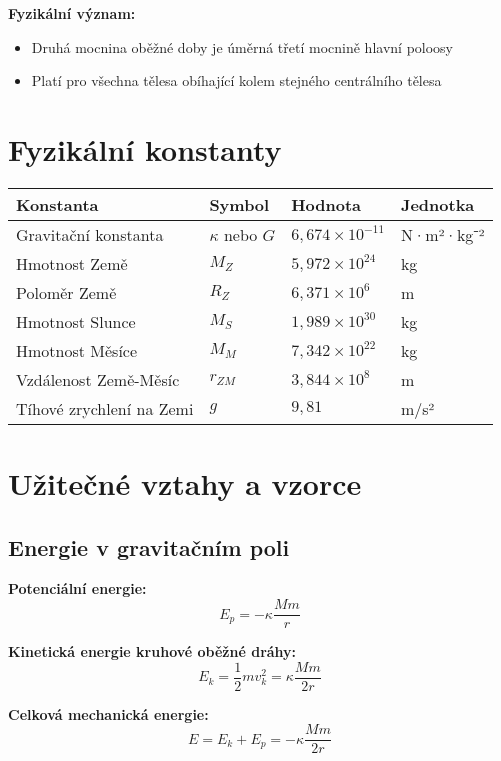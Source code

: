 \documentclass[11pt,a4paper]{article}
\begin{document}
\textbf{Fyzikální význam:}

\begin{itemize}
\item Druhá mocnina oběžné doby je úměrná třetí mocnině hlavní poloosy
\item Platí pro všechna tělesa obíhající kolem stejného centrálního tělesa
\end{itemize}

\clearpage

\section{Fyzikální konstanty}

\begin{longtable}{llll}
\toprule
Konstanta & Symbol & Hodnota & Jednotka \\
\midrule
Gravitační konstanta & $\kappa$ nebo $G$ & $6{,}674 \times 10^{-11}$ & N·m²·kg⁻² \\
Hmotnost Země & $M_Z$ & $5{,}972 \times 10^{24}$ & kg \\
Poloměr Země & $R_Z$ & $6{,}371 \times 10^{6}$ & m \\
Hmotnost Slunce & $M_S$ & $1{,}989 \times 10^{30}$ & kg \\
Hmotnost Měsíce & $M_M$ & $7{,}342 \times 10^{22}$ & kg \\
Vzdálenost Země-Měsíc & $r_{ZM}$ & $3{,}844 \times 10^{8}$ & m \\
Tíhové zrychlení na Zemi & $g$ & $9{,}81$ & m/s² \\
\bottomrule
\end{longtable}

\clearpage

\section{Užitečné vztahy a vzorce}

\subsection{Energie v gravitačním poli}

\textbf{Potenciální energie:}
\[E_p = -\kappa \frac{Mm}{r}\]

\textbf{Kinetická energie kruhové oběžné dráhy:}
\[E_k = \frac{1}{2}mv_k^2 = \kappa \frac{Mm}{2r}\]

\textbf{Celková mechanická energie:}
\[E = E_k + E_p = -\kappa \frac{Mm}{2r}\]
\end{document}
